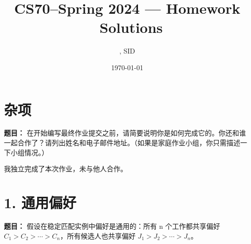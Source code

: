 \documentclass[11pt]{article}
\title{CS70--Spring 2024 --- Homework \Homework \ Solutions}
\author{\Name, SID \SID}
\date{\today}
\begin{document}
\maketitle

\section*{杂项}
\textbf{题目：} 在开始编写最终作业提交之前，请简要说明你是如何完成它的。你还和谁一起合作了？请列出姓名和电子邮件地址。（如果是家庭作业小组，你只需描述一下小组情况。）

我独立完成了本次作业，未与他人合作。

\section*{1. 通用偏好}
\textbf{题目：} 假设在稳定匹配实例中偏好是通用的：所有 n 个工作都共享偏好 $C_{1}>C_{2}>\cdots>C_{n}$，所有候选人也共享偏好 $J_{1}>J_{2}>\cdots>J_{n}$。
\end{document}
